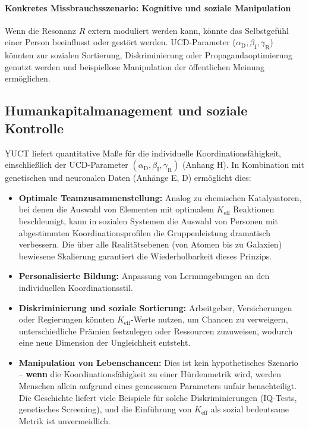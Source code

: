 \documentclass[12pt,a4paper]{article}
\theoremstyle{remark}
\newcommand{\Keff}{K_{\mathrm{eff}}}
\newcommand{\alD}{\alpha_{\mathrm{D}}}
\newcommand{\beI}{\beta_{\mathrm{I}}}
\newcommand{\gaR}{\gamma_{\mathrm{R}}}
\begin{document}
	\paragraph{Konkretes Missbrauchsszenario: Kognitive und soziale Manipulation}
	Wenn die Resonanz \(R\) extern moduliert werden kann, könnte das Selbstgefühl einer Person beeinflusst oder gestört werden. UCD-Parameter (\(\alD,\beI,\gaR\)) könnten zur sozialen Sortierung, Diskriminierung oder Propagandaoptimierung genutzt werden und beispiellose Manipulation der öffentlichen Meinung ermöglichen.
	
	\subsection{Humankapitalmanagement und soziale Kontrolle}
	\label{subsec:human}
	
	YUCT liefert quantitative Maße für die individuelle Koordinationsfähigkeit, einschließlich der UCD-Parameter \((\alD,\beI,\gaR)\) (Anhang H). In Kombination mit genetischen und neuronalen Daten (Anhänge E, D) ermöglicht dies:
	\begin{itemize}[leftmargin=*]
		\item \textbf{Optimale Teamzusammenstellung:} Analog zu chemischen Katalysatoren, bei denen die Auswahl von Elementen mit optimalem \(\Keff\) Reaktionen beschleunigt, kann in sozialen Systemen die Auswahl von Personen mit abgestimmten Koordinationsprofilen die Gruppenleistung dramatisch verbessern. Die über alle Realitätsebenen (von Atomen bis zu Galaxien) bewiesene Skalierung garantiert die Wiederholbarkeit dieses Prinzips.
		\item \textbf{Personalisierte Bildung:} Anpassung von Lernumgebungen an den individuellen Koordinationsstil.
		\item \textbf{Diskriminierung und soziale Sortierung:} Arbeitgeber, Versicherungen oder Regierungen könnten \(\Keff\)-Werte nutzen, um Chancen zu verweigern, unterschiedliche Prämien festzulegen oder Ressourcen zuzuweisen, wodurch eine neue Dimension der Ungleichheit entsteht.
		\item \textbf{Manipulation von Lebenschancen:} Dies ist kein hypothetisches Szenario – \textbf{wenn} die Koordinationsfähigkeit zu einer Hürdenmetrik wird, werden Menschen allein aufgrund eines gemessenen Parameters unfair benachteiligt. Die Geschichte liefert viele Beispiele für solche Diskriminierungen (IQ-Tests, genetisches Screening), und die Einführung von \(\Keff\) als sozial bedeutsame Metrik ist unvermeidlich.
	\end{itemize}
	
\end{document}
